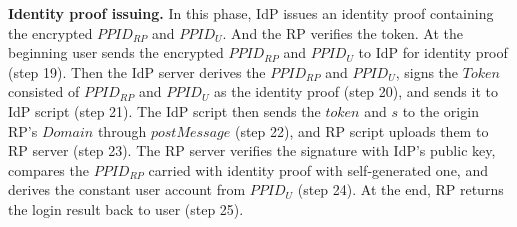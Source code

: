 \vspace{0.5mm}\noindent\textbf{Identity proof issuing.} In this phase, IdP issues an identity proof containing the encrypted $PPID_{RP}$ and $PPID_U$. And the RP verifies the token.
At the beginning user sends the encrypted $PPID_{RP}$ and $PPID_U$ to IdP for identity proof (step 19). 
Then the IdP server derives the $PPID_{RP}$ and $PPID_U$, signs the $Token$ consisted of $PPID_{RP}$ and $PPID_U$ as the identity proof (step 20), and sends it to IdP script (step 21). 
The IdP script then sends the $token$ and $s$ to the origin RP's $Domain$ through $postMessage$ (step 22), and  RP script uploads them to RP server (step 23). 
The RP server verifies the signature with IdP's public key, compares the $PPID_{RP}$ carried with identity proof with self-generated one, and derives the constant user account from $PPID_U$ (step 24). 
At the end, RP returns the login result back to user (step 25).

